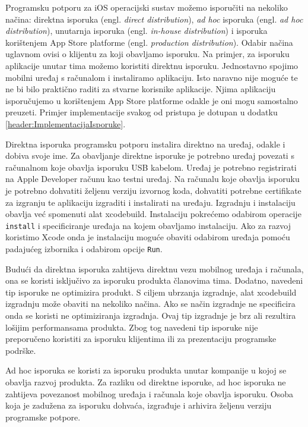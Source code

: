 \documentclass[times, utf8, diplomski, numeric]{fer}
\newcommand{\eng}[1]{(engl. \textit{#1})}
\begin{document}
Programsku potporu za iOS operacijski sustav možemo isporučiti na nekoliko načina: direktna isporuka \eng{direct distribution}, \textit{ad hoc} isporuka \eng{ad hoc distribution}, unutarnja isporuka \eng{in-house distribution} i isporuka korištenjem App Store platforme \eng{production distribution}. Odabir načina uglavnom ovisi o klijentu za koji obavljamo isporuku. Na primjer, za isporuku aplikacije unutar tima možemo koristiti direktnu isporuku. Jednostavno spojimo mobilni uređaj s računalom i instaliramo aplikaciju. Isto naravno nije moguće te ne bi bilo praktično raditi za stvarne korisnike aplikacije. Njima aplikaciju isporučujemo u korištenjem App Store platforme odakle je oni mogu samostalno preuzeti. Primjer implementacije svakog od pristupa je dotupan u dodatku \ref{header:ImplementacijaIsporuke}.

Direktna isporuka programsku potporu instalira direktno na uređaj, odakle i dobiva svoje ime. Za obavljanje direktne isporuke je potrebno uređaj povezati s računalnom koje obavlja isporuku USB kabelom. Uređaj je potrebno registrirati na Apple Developer računu kao testni uređaj. Na računalu koje obavlja isporuku je potrebno dohvatiti željenu verziju izvornog koda, dohvatiti potrebne certifikate za izgranju te aplikaciju izgraditi i instalirati na uređaju. Izgradnju i instalaciju obavlja već spomenuti alat xcodebuild. Instalaciju pokrećemo odabirom operacije \verb|install| i specificiranje uređaja na kojem obavljamo instalaciju. Ako za razvoj koristimo Xcode onda je instalaciju moguće obaviti odabirom uređaja pomoću padajućeg izbornika i odabirom opcije \verb|Run|.

Budući da direktna isporuka zahtijeva direktnu vezu mobilnog uređaja i računala, ona se koristi isključivo za isporuku produkta članovima tima. Dodatno, navedeni tip isporuke ne optimizira produkt. S ciljem ubrzanja izgradnje, alat xcodebuild izgradnju može obaviti na nekoliko načina. Ako se način izgradnje ne specificira onda se koristi ne optimiziranja izgradnja. Ovaj tip izgradnje je brz ali rezultira lošijim performansama produkta. Zbog tog navedeni tip isporuke nije preporučeno koristiti za isporuku klijentima ili za prezentaciju programske podrške.

Ad hoc isporuka se koristi za isporuku produkta unutar kompanije u kojoj se obavlja razvoj produkta. Za razliku od direktne isporuke, ad hoc isporuka ne zahtijeva povezanost mobilnog uređaja i računala koje obavlja isporuku. Osoba koja je zadužena za isporuku dohvaća, izgrađuje i arhivira željenu verziju programske potpore.
\end{document}
